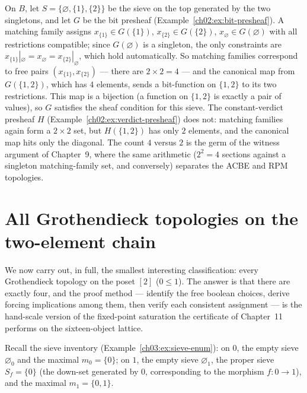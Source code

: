 \begin{example}\label{ch03:ex:sheaf-preview}
On $B$, let $S = \{\varnothing, \{1\}, \{2\}\}$ be the sieve on the
top generated by the two singletons, and let $G$ be the bit
presheaf (Example~\ref{ch02:ex:bit-presheaf}). A matching family
assigns $x_{\{1\}} \in G(\{1\})$, $x_{\{2\}} \in G(\{2\})$,
$x_\varnothing \in G(\varnothing)$ with all restrictions
compatible; since $G(\varnothing)$ is a singleton, the only
constraints are $x_{\{1\}}|_\varnothing = x_\varnothing =
x_{\{2\}}|_\varnothing$, which hold automatically. So matching
families correspond to free pairs
$(x_{\{1\}}, x_{\{2\}})$ --- there are $2 \times 2 = 4$ --- and
the canonical map from $G(\{1,2\})$, which has $4$ elements, sends
a bit-function on $\{1,2\}$ to its two restrictions. This map is a
bijection (a function on $\{1,2\}$ is exactly a pair of values), so
$G$ satisfies the sheaf condition for this sieve. The
constant-verdict presheaf $H$
(Example~\ref{ch02:ex:verdict-presheaf}) does not: matching
families again form a $2 \times 2$ set, but $H(\{1,2\})$ has only
$2$ elements, and the canonical map hits only the diagonal. The
count $4$ versus $2$ is the germ of the witness argument of
Chapter~9, where the same arithmetic ($2^2 = 4$ sections against a
singleton matching-family set, and conversely) separates the ACBE
and RPM topologies.
\end{example}

\section{All Grothendieck topologies on the two-element chain}\label{ch03:sec:enumeration}

We now carry out, in full, the smallest interesting classification:
every Grothendieck topology on the poset $[2]$
($0 \le 1$). The answer is that there are exactly four, and the
proof method --- identify the free boolean choices, derive forcing
implications among them, then verify each consistent assignment ---
is the hand-scale version of the fixed-point saturation the
certificate of Chapter~11 performs on the sixteen-object lattice.

Recall the sieve inventory (Example~\ref{ch03:ex:sieve-enum}): on
$0$, the empty sieve $\varnothing_0$ and the maximal
$m_0 = \{0\}$; on $1$, the empty sieve $\varnothing_1$, the
proper sieve $S_f = \{0\}$ (the down-set generated by $0$,
corresponding to the morphism $f : 0 \to 1$), and the maximal
$m_1 = \{0, 1\}$.

